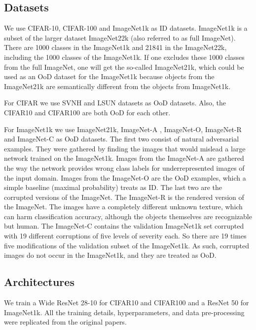 \documentclass{article}
\begin{document}
\subsection{Datasets}
We use CIFAR-10, CIFAR-100 \cite{cifar} and ImageNet1k \cite{imagenet} as ID datasets.
ImageNet1k is a subset of the larger dataset ImageNet22k (also referred to as full ImageNet).
There are 1000 classes in the ImageNet1k and 21841 in the ImageNet22k, including the 1000 classes of the ImageNet1k.
If one excludes these 1000 classes from the full ImageNet, one will get the so-called ImageNet21k, which could be used as an OoD dataset for the ImageNet1k because objects from the ImageNet21k are semantically different from the objects from ImageNet1k.

For CIFAR we use SVNH \cite{svhn} and LSUN \cite{lsun} datasets as OoD datasets.
Also, the CIFAR10 and CIFAR100 are both OoD for each other.

For ImageNet1k we use ImageNet21k, ImageNet-A \cite{imagenet_a_o}, ImageNet-O, ImageNet-R \cite{imagenet_r} and ImageNet-C \cite{imagenet_c} as OoD datasets.
The first two consist of natural adversarial examples.
They were gathered by finding the images that would mislead a large network trained on the ImageNet1k.
Images from the ImageNet-A are gathered the way the network provides wrong class labels for underrepresented images of the input domain.
Images from the ImageNet-O are the OoD examples, which a simple baseline (maximal probability) treats as ID.
The last two are the corrupted versions of the ImageNet.
The ImageNet-R is the rendered version of the ImageNet.
The images have a completely different unknown texture, which can harm classification accuracy, although the objects themselves are recognizable but human.
The ImageNet-C contains the validation ImageNet1k set corrupted with 19 different corruptions of five levels of severity each.
So there are 19 times five modifications of the validation subset of the ImageNet1k.
As such, corrupted images do not occur in the ImageNet1k, and they are treated as OoD.

\subsection{Architectures}
We train a Wide ResNet 28-10 \cite{wide_resnet} for CIFAR10 and CIFAR100 and a ResNet 50 \cite{resnet} for ImageNet1k.
All the training details, hyperparameters, and data pre-processing were replicated from the original papers.
\end{document}
